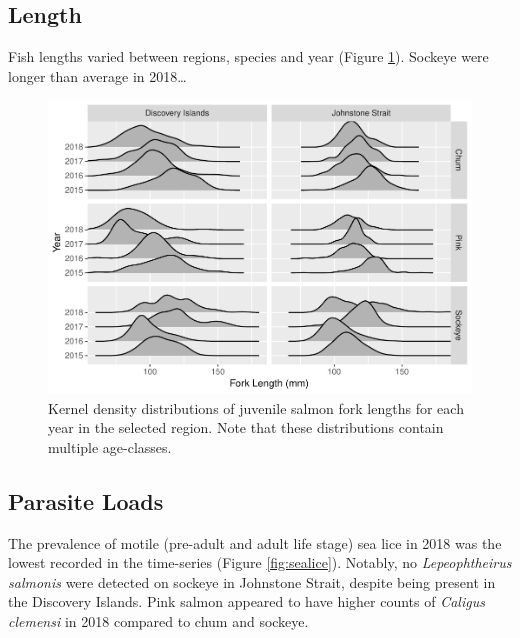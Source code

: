\documentclass[fleqn,10pt]{wlpeerj} %
\begin{document}
\subsection*{Length}\label{length}

Fish lengths varied between regions, species and year (Figure
\ref{fig:length}). Sockeye were longer than average in 2018\ldots{}

\begin{figure}
\includegraphics[width=0.8\linewidth]{peer_j_migration_dynamics_files/figure-latex/length-1} \caption{Kernel density distributions of juvenile salmon fork lengths for each year in the selected region. Note that these distributions contain multiple age-classes.}\label{fig:length}
\end{figure}

\subsection*{Parasite Loads}\label{parasite-loads}

The prevalence of motile (pre-adult and adult life stage) sea lice in
2018 was the lowest recorded in the time-series (Figure
\ref{fig:sealice}). Notably, no \emph{Lepeophtheirus salmonis} were
detected on sockeye in Johnstone Strait, despite being present in the
Discovery Islands. Pink salmon appeared to have higher counts of
\emph{Caligus clemensi} in 2018 compared to chum and sockeye.
\end{document}
